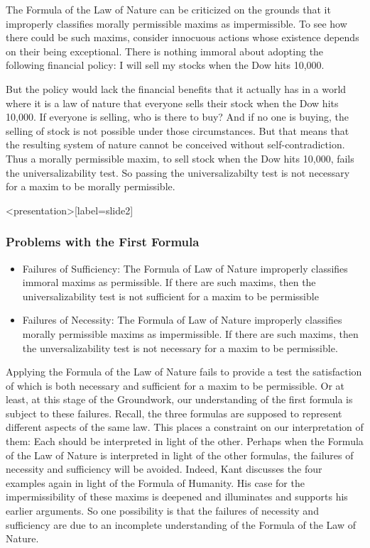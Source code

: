 The Formula of the Law of Nature can be criticized on the grounds that it improperly classifies morally permissible maxims as impermissible. To see how there could be such maxims, consider innocuous actions whose existence depends on their being exceptional. There is nothing immoral about adopting the following financial policy: I will sell my stocks when the Dow hits 10,000.

But the policy would lack the financial benefits that it actually has in a world where it is a law of nature that everyone sells their stock when the Dow hits 10,000. If everyone is selling, who is there to buy? And if no one is buying, the selling of stock is not possible under those circumstances. But that means that the resulting system of nature cannot be conceived without self-contradiction. Thus a morally permissible maxim, to sell stock when the Dow hits 10,000, fails the universalizability test. So passing the universalizabilty test is not necessary for a maxim to be morally permissible. \change

\begin{frame}<presentation>[label=slide2]
    \frametitle{Problems with the First Formula}
        \begin{itemize}
            \item<2-> \alert{Failures of Sufficiency}: The Formula of Law of Nature improperly classifies immoral maxims as permissible. If there are such maxims, then the universalizability test is not sufficient for a maxim to be permissible
           \item<3-> \alert{Failures of Necessity}: The Formula of Law of Nature improperly classifies morally permissible maxims as impermissible. If there are such maxims, then the unversalizability test is not necessary for a maxim to be permissible.
        \end{itemize}
\end{frame}

Applying the Formula of the Law of Nature fails to provide a test the satisfaction of which is both necessary and sufficient for a maxim to be permissible. Or at least, at this stage of the Groundwork, our understanding of the first formula is subject to these failures. Recall, the three formulas are supposed to represent different aspects of the same law. This places a constraint on our interpretation of them: Each should be interpreted in light of the other. Perhaps when the Formula of the Law of Nature is interpreted in light of the other formulas, the failures of necessity and sufficiency will be avoided. Indeed, Kant discusses the four examples again in light of the Formula of Humanity. His case for the impermissibility of these maxims is deepened and illuminates and supports his earlier arguments. So one possibility is that the failures of necessity and sufficiency are due to an incomplete understanding of the Formula of the Law of Nature.

